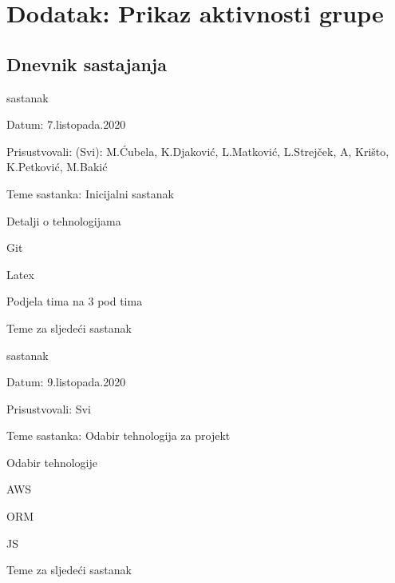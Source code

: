 \chapter*{Dodatak: Prikaz aktivnosti grupe}
		
		\section*{Dnevnik sastajanja}
		
			\begin{packed_enum}
			\item  sastanak
			
			\item[] \begin{packed_item}
				\item Datum: 7.listopada.2020
				\item Prisustvovali: (Svi): M.Ćubela, K.Djaković, L.Matković, L.Strejček, A, Krišto, K.Petković, M.Bakić
				\item Teme sastanka: Inicijalni sastanak
				\begin{packed_item}
					\item Detalji o tehnologijama
					\item Git
					\item Latex
					\item Podjela tima na 3 pod tima
					\item Teme za sljedeći sastanak
				\end{packed_item}
			\end{packed_item}
			
			\item  sastanak
			\item[] \begin{packed_item}
				\item Datum: 9.listopada.2020
				\item Prisustvovali: Svi
				\item Teme sastanka: Odabir tehnologija za projekt
				\begin{packed_item}
					\item Odabir tehnologije
					\item AWS
					\item ORM
					\item JS
					\item Teme za sljedeći sastanak
				\end{packed_item}
			\end{packed_item}
			

\end{packed_enum}
